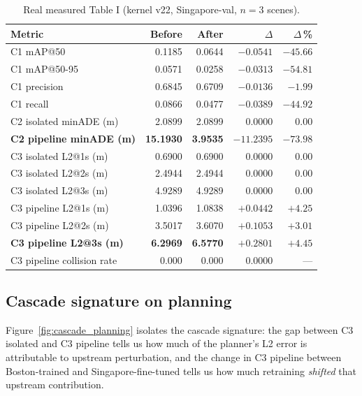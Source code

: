 \documentclass[11pt,a4paper]{article}
\begin{document}
\begin{table}[h!]
\centering
\caption{Real measured Table I (kernel v22, Singapore-val, $n=3$ scenes).}
\label{tab:e1_real_results}
\renewcommand{\arraystretch}{1.25}
\small
\begin{tabular}{@{}lrrrr@{}}
\toprule
\textbf{Metric} & \textbf{Before} & \textbf{After} & \textbf{$\Delta$} & \textbf{$\Delta$\,\%} \\
\midrule
C1 mAP@50                  & 0.1185 & 0.0644 & $-0.0541$ & $-45.66$ \\
C1 mAP@50-95               & 0.0571 & 0.0258 & $-0.0313$ & $-54.81$ \\
C1 precision               & 0.6845 & 0.6709 & $-0.0136$ & $-1.99$  \\
C1 recall                  & 0.0866 & 0.0477 & $-0.0389$ & $-44.92$ \\
C2 isolated minADE (m)     & 2.0899 & 2.0899 & $0.0000$  & $0.00$   \\
\textbf{C2 pipeline minADE (m)}      & \textbf{15.1930} & \textbf{3.9535} & \boldmath$-11.2395$ & \boldmath$-73.98$ \\
C3 isolated L2@1s (m)      & 0.6900 & 0.6900 & $0.0000$  & $0.00$   \\
C3 isolated L2@2s (m)      & 2.4944 & 2.4944 & $0.0000$  & $0.00$   \\
C3 isolated L2@3s (m)      & 4.9289 & 4.9289 & $0.0000$  & $0.00$   \\
C3 pipeline L2@1s (m)      & 1.0396 & 1.0838 & $+0.0442$ & $+4.25$  \\
C3 pipeline L2@2s (m)      & 3.5017 & 3.6070 & $+0.1053$ & $+3.01$  \\
\textbf{C3 pipeline L2@3s (m)}       & \textbf{6.2969} & \textbf{6.5770} & \boldmath$+0.2801$ & \boldmath$+4.45$ \\
C3 pipeline collision rate & 0.000  & 0.000  & $0.0000$  & ---      \\
\bottomrule
\end{tabular}
\end{table}

\subsection{Cascade signature on planning}

Figure~\ref{fig:cascade_planning} isolates the cascade
signature: the gap between C3 isolated and C3 pipeline tells us how
much of the planner's L2 error is attributable to upstream
perturbation, and the change in C3 pipeline between Boston-trained and
Singapore-fine-tuned tells us how much retraining \emph{shifted} that
upstream contribution.
\end{document}
